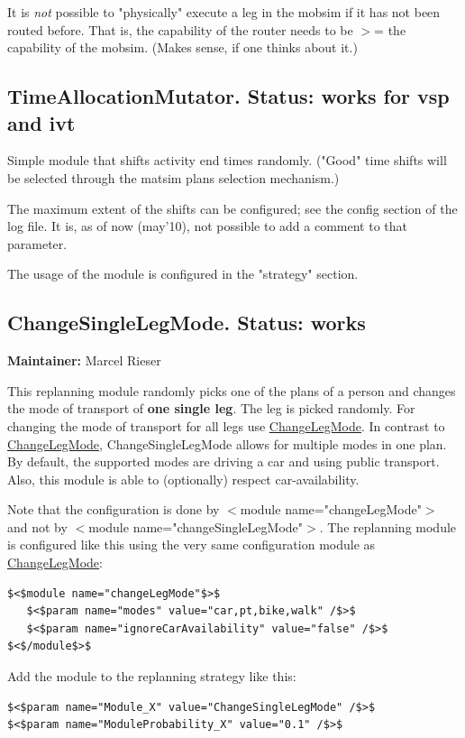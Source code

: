 It is \emph{not} possible to "physically" execute a leg in the  mobsim if it has not been routed before. That is, the capability  of the router needs to be $>$= the capability of the mobsim.  (Makes sense, if one thinks about it.)

\subsection{TimeAllocationMutator.  Status: works for vsp and ivt}

Simple  module that shifts activity end times randomly. ("Good" time  shifts will be selected through the matsim plans selection mechanism.)

The maximum extent of the shifts can be configured; see the config  section of the log file. It is, as of now (may'10), not possible  to add a comment to that parameter.

The usage of the module is configured in the "strategy" section.

\subsection{ ChangeSingleLegMode. Status: works}

\textbf{Maintainer:} Marcel Rieser

This replanning module randomly picks one of the plans of a person and changes the mode of transport of \textbf{one single leg}. The leg is picked randomly. For changing the mode of transport for all legs use \href{http://www.matsim.org/node/387}{ChangeLegMode}. In contrast to \href{http://www.matsim.org/node/387}{ChangeLegMode},  ChangeSingleLegMode allows for multiple modes in one plan. By default,  the supported modes are driving a car and using public transport. Also,  this module is able to (optionally) respect car-availability.

Note that the configuration is done by $<$module  name="changeLegMode"$>$ and not by $<$module  name="changeSingleLegMode"$>$. The replanning module is configured like  this using the very same configuration module as \href{http://www.matsim.org/node/387}{ChangeLegMode}:
\begin{verbatim}
$<$module name="changeLegMode"$>$
   $<$param name="modes" value="car,pt,bike,walk" /$>$
   $<$param name="ignoreCarAvailability" value="false" /$>$
$<$/module$>$
\end{verbatim}

Add the module to the replanning strategy like this:
\begin{verbatim}
$<$param name="Module_X" value="ChangeSingleLegMode" /$>$
$<$param name="ModuleProbability_X" value="0.1" /$>$
\end{verbatim}

